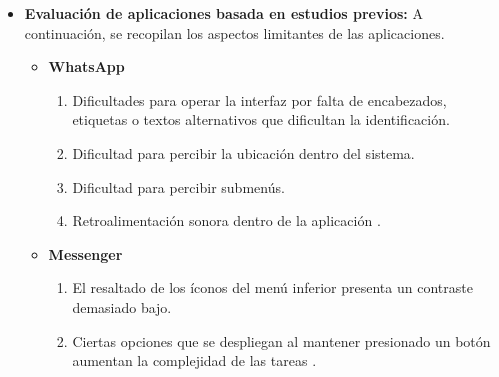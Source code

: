 \documentclass[lettersize,journal]{IEEEtran}
\begin{document}
\begin{itemize}
	
		\item \textbf{Evaluación de aplicaciones basada en estudios previos:} A continuación, se recopilan los aspectos limitantes de las aplicaciones.
	
		\begin{itemize}
			\item \textbf{WhatsApp}
			\begin{enumerate}
				\item Dificultades para operar la interfaz por falta de encabezados, etiquetas o textos alternativos que dificultan la identificación.
				\item Dificultad para percibir la ubicación dentro del sistema.
				\item Dificultad para percibir submenús.
				\item Retroalimentación sonora dentro de la aplicación \cite{Ferreira2016,Huang2025}.
			\end{enumerate}
			
			\item \textbf{Messenger}
			\begin{enumerate}
				\item El resaltado de los íconos del menú inferior presenta un contraste demasiado bajo.
				\item Ciertas opciones que se despliegan al mantener presionado un botón aumentan la complejidad de las tareas \cite{Ferreira2016,Huang2025}.
			\end{enumerate}
			

\end{itemize}
\end{itemize}
\end{document}
